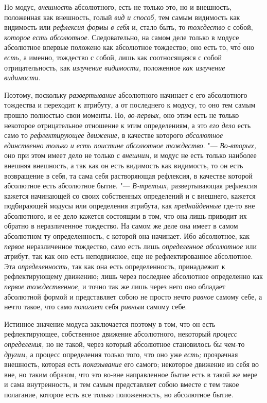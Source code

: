 Но модус, {\em внешность} абсолютного, есть не только
это, но и внешность, положенная как внешность, голый
{\em вид и способ,} тем самым видимость как видимость
или {\em рефлексия формы в себя} и, стало быть, то {\em тождество} с собой,
{\em которое есть абсолютное}. Следовательно, на самом
деле только в модусе абсолютное впервые положено как абсолютное тождество;
оно есть то, чт\'{о} оно {\em есть,} а именно, тождество с
собой, лишь как соотносящаяся с собой отрицательность, как
{\em излучение видимости,} положенное {\em как излучение видимости}.

Поэтому, поскольку {\em развертывание} абсолютного
начинает с его абсолютного тождества и переходит к атрибуту, а от
последнего к модусу, то оно тем самым прошло полностью свои моменты. Но,
{\em во-первых,} оно этим есть не только некоторое
отрицательное отношение к этим определениям, а это {\em его дело} есть само то
{\em рефлектирующее движение,} в качестве которого
{\em абсолютное единственно только и есть поистине
абсолютное тождество}. "--- {\em Во-вторых,} оно при этом
имеет дело не только с {\em внешним,} и модус не есть
только наиболее внешняя внешность, а так как он есть видимость как
видимость, то он есть возвращение в себя, та сама себя растворяющая
рефлексия, в качестве которой абсолютное есть абсолютное бытие. "---
{\em В-третьих,} развертывающая рефлексия кажется
начинающей со своих собственных определений и с внешнего, кажется
подбирающей модусы или определения атрибута, как
{\em преднайденные} где-то вне абсолютного, и ее дело
кажется состоящим в том, что она лишь приводит их обратно в неразличенное
тождество. На самом же деле она имеет в самом абсолютном ту определенность,
с которой она начинает. Ибо абсолютное, как
{\em первое} неразличенное тождество, само есть лишь
{\em определенное абсолютное} или атрибут, так как оно
есть неподвижное, еще не рефлектированное абсолютное. Эта
{\em определенность,} так как она есть определенность,
принадлежит к рефлектирующему движению; лишь через последнее абсолютное
определенно как {\em первое тождественное,} и точно так
же лишь через него оно обладает абсолютной формой и представляет собою не
просто нечто {\em равное} самому себе, а нечто такое,
что само {\em полагает} себя
{\em равным} самому себе.

Истинное значение модуса заключается поэтому в том, что он есть
рефлектирующее, собственное движение абсолютного, некоторый
{\em процесс определения,} но не такой, через который
абсолютное становилось бы чем-то {\em другим,} а
процесс определения только того, что оно уже
{\em есть;} прозрачная внешность, которая есть
{\em показывание} его самого; некоторое движение из
себя во вне, но таким образом, что это во-вне направленное бытие есть в
такой же мере и сама внутренность, и тем самым представляет собою вместе с
тем такое полагание, которое есть все только положенность, но абсолютное бытие.

